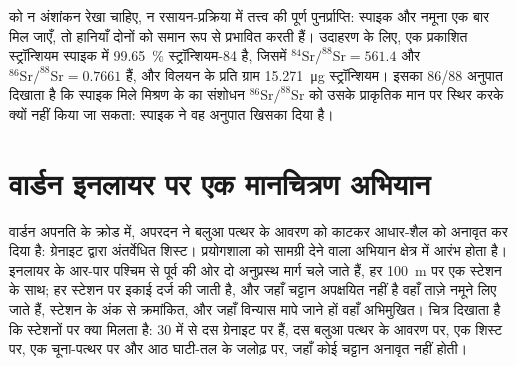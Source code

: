  को न अंशांकन रेखा चाहिए, न रसायन-प्रक्रिया में तत्त्व की
पूर्ण पुनर्प्राप्ति: स्पाइक और नमूना एक बार मिल जाएँ, तो हानियाँ दोनों को समान रूप से प्रभावित करती हैं। उदाहरण के लिए, एक प्रकाशित स्ट्रॉन्शियम
स्पाइक में \qty{99.65}{\percent} स्ट्रॉन्शियम-84 है, जिसमें
$^{84}\mathrm{Sr}/^{88}\mathrm{Sr} = 561.4$ और $^{86}\mathrm{Sr}/^{88}\mathrm{Sr} = 0.7661$ हैं, और
विलयन के प्रति ग्राम \qty{15.271}{\micro\gram} स्ट्रॉन्शियम। इसका 86/88 अनुपात दिखाता है कि
स्पाइक मिले मिश्रण के  का संशोधन $^{86}\mathrm{Sr}/^{88}\mathrm{Sr}$ को उसके
प्राकृतिक मान पर स्थिर करके क्यों नहीं किया जा सकता: स्पाइक ने वह अनुपात खिसका दिया है।

\section{वार्डन इनलायर पर एक मानचित्रण अभियान}\label{sec:b2:field-lab-methods-2:campaign}

वार्डन अपनति के क्रोड में, अपरदन ने बलुआ पत्थर के आवरण को काटकर
आधार-शैल को अनावृत कर दिया है: ग्रेनाइट द्वारा अंतर्वेधित शिस्ट। प्रयोगशाला को सामग्री देने वाला अभियान
क्षेत्र में आरंभ होता है। इनलायर के आर-पार पश्चिम से पूर्व की ओर दो अनुप्रस्थ मार्ग चले जाते हैं, हर
\qty{100}{m} पर एक स्टेशन के साथ; हर स्टेशन पर इकाई दर्ज की जाती है, और जहाँ चट्टान
अपक्षयित नहीं है वहाँ ताज़े नमूने लिए जाते हैं, स्टेशन के अंक से क्रमांकित, और जहाँ विन्यास मापे जाने हों वहाँ अभिमुखित। चित्र
दिखाता है कि स्टेशनों पर क्या मिलता है: 30 में से दस ग्रेनाइट पर हैं, दस बलुआ पत्थर के आवरण पर, एक
शिस्ट पर, एक चूना-पत्थर पर और आठ घाटी-तल के जलोढ़ पर, जहाँ कोई चट्टान अनावृत
नहीं होती।

